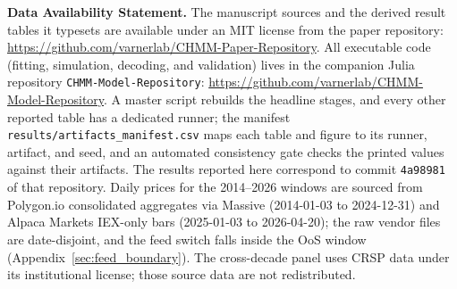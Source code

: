 \medskip
\noindent\textbf{Data Availability Statement.} The manuscript sources and the derived result tables it typesets are available under an MIT license from the paper repository: \url{https://github.com/varnerlab/CHMM-Paper-Repository}. All executable code (fitting, simulation, decoding, and validation) lives in the companion Julia repository \texttt{CHMM-Model-Repository}: \url{https://github.com/varnerlab/CHMM-Model-Repository}. A master script rebuilds the headline stages, and every other reported table has a dedicated runner; the manifest \texttt{results/artifacts\_manifest.csv} maps each table and figure to its runner, artifact, and seed, and an automated consistency gate checks the printed values against their artifacts. The results reported here correspond to commit \texttt{4a98981} of that repository. Daily prices for the 2014--2026 windows are sourced from Polygon.io consolidated aggregates via Massive (2014-01-03 to 2024-12-31) and Alpaca Markets IEX-only bars (2025-01-03 to 2026-04-20); the raw vendor files are date-disjoint, and the feed switch falls inside the OoS window (Appendix~\ref{sec:feed_boundary}). The cross-decade panel uses CRSP data under its institutional license; those source data are not redistributed.
